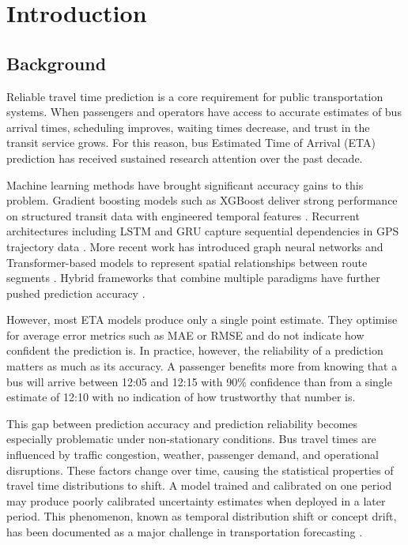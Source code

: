 \documentclass[12pt, a4paper, oneside]{report}
\begin{document}
\chapter{Introduction}

\section{Background}

Reliable travel time prediction is a core requirement for public transportation systems. When passengers and operators have access to accurate estimates of bus arrival times, scheduling improves, waiting times decrease, and trust in the transit service grows. For this reason, bus Estimated Time of Arrival (ETA) prediction has received sustained research attention over the past decade.

Machine learning methods have brought significant accuracy gains to this problem. Gradient boosting models such as XGBoost deliver strong performance on structured transit data with engineered temporal features \cite{Savithramma20241003}. Recurrent architectures including LSTM and GRU capture sequential dependencies in GPS trajectory data \cite{Munkhbayar2025695}. More recent work has introduced graph neural networks and Transformer-based models to represent spatial relationships between route segments \cite{Lin202330384, Ma2022}. Hybrid frameworks that combine multiple paradigms have further pushed prediction accuracy \cite{Wang2018858, Chu202376095}.

However, most ETA models produce only a single point estimate. They optimise for average error metrics such as MAE or RMSE and do not indicate how confident the prediction is. In practice, however, the reliability of a prediction matters as much as its accuracy. A passenger benefits more from knowing that a bus will arrive between 12:05 and 12:15 with 90\% confidence than from a single estimate of 12:10 with no indication of how trustworthy that number is.

This gap between prediction accuracy and prediction reliability becomes especially problematic under non-stationary conditions. Bus travel times are influenced by traffic congestion, weather, passenger demand, and operational disruptions. These factors change over time, causing the statistical properties of travel time distributions to shift. A model trained and calibrated on one period may produce poorly calibrated uncertainty estimates when deployed in a later period. This phenomenon, known as temporal distribution shift or concept drift, has been documented as a major challenge in transportation forecasting \cite{Du2021402, Han20234100}.
\end{document}
